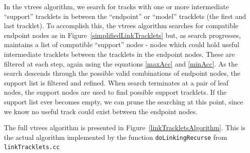 In the vtrees algorithm, we search for tracks with one or more
intermediate ``support'' tracklets in between the ``endpoint'' or
``model'' tracklets (the first and last tracklet).  To accomplish
this, the vtrees algorithm searches for compatible endpoint nodes as
in Figure~\ref{simplifiedLinkTracklets} but, as search progresses, maintains
a list of compatible ``support'' nodes - nodes which could hold useful
intermediate tracklets between the tracklets in the endpoint nodes.
These are filtered at each step, again using the equations
\ref{maxAcc} and \ref{minAcc}.  As the search descends through the
possible valid combinations of endpoint nodes, the support list is
filtered and refined.  When search terminates at a pair of leaf nodes,
the support nodes are used to find possible support tracklets.  If the
support list ever becomes empty, we can prune the searching at this
point, since we know no useful track could exist between the endpoint
nodes.

The full vtrees algorithm is presented in
Figure~\ref{linkTrackletsAlgorithm}.  This is the actual algorithm
implemented by the function {\tt doLinkingRecurse} from {\tt linkTracklets.cc}


